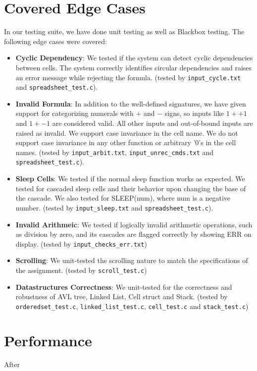 \documentclass[10pt,a4paper]{article}  %
\begin{document}
\section{Covered Edge Cases}

In our testing suite, we have done unit testing as well as Blackbox testing.
The following edge cases were covered:

\begin{itemize}
    \item \textbf{Cyclic Dependency}: We tested if the system can detect cyclic dependencies between cells. The system correctly identifies circular dependencies and raises an error message while rejecting the formula. (tested by \texttt{input\_cycle.txt} and \texttt{spreadsheet\_test.c}).
    \item \textbf{Invalid Formula}: In addition to the well-defined signatures, we have given support for categorizing numerals with \(+\) and \(-\) signs, so inputs like \(1++1\) and \(1+-1\) are considered valid. All other inputs and out-of-bound inputs are raised as invalid. We support case invariance in the cell name. We do not support case invariance in any other function or arbitrary '0's in the cell names. (tested by \texttt{input\_arbit.txt}, \texttt{input\_unrec\_cmds.txt} and \texttt{spreadsheet\_test.c}).
    \item \textbf{Sleep Cells}: We tested if the normal sleep function works as expected. We tested for cascaded sleep cells and their behavior upon changing the base of the cascade. We also tested for SLEEP(num), where num is a negative number. (tested by \texttt{input\_sleep.txt} and \texttt{spreadsheet\_test.c}).
    \item \textbf{Invalid Arithmeic}: We tested if logically invalid arithmetic operations, such as division by zero, and its cascades are flagged correctly by showing ERR on display. (tested by \texttt{input\_checks\_err.txt})
    \item \textbf{Scrolling}: We unit-tested the scrolling nature to match the specifications of the assignment. (tested by \texttt{scroll\_test.c})
    \item \textbf{Datastructures Correctness}: We unit-tested for the correctness and robustness of AVL tree, Linked List, Cell struct and Stack. (tested by \texttt{orderedset\_test.c}, \texttt{linked\_list\_test.c}, \texttt{cell\_test.c} and \texttt{stack\_test.c})
\end{itemize}

\section{Performance}
After 



\end{document}
